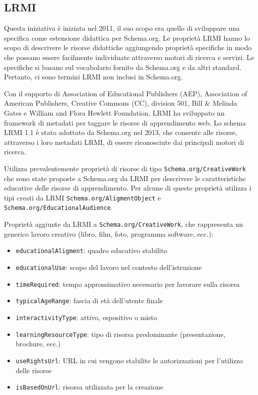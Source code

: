 \subsection{LRMI}
Questa iniziativa è iniziata nel 2011, il suo scopo era quello di sviluppare una specifica come estensione didattica per Schema.org. Le proprietà LRMI hanno lo scopo di descrivere le risorse didattiche aggiungendo proprietà specifiche in modo che possano essere facilmente individuate attraverso motori di ricerca e servizi. Le specifiche si basano sul vocabolario fornito da Schema.org e da altri standard. Pertanto, ci sono termini LRMI non inclusi in Schema.org. 

Con il supporto di Association of Educational Publishers (AEP), Association of American Publishers, Creative Commons (CC), division 501, Bill \& Melinda Gates e William and Flora Hewlett Foundation, LRMI ha sviluppato un framework di metadati per taggare le risorse di apprendimento web. Lo schema LRMI 1.1 è stato adottato da Schema.org nel 2013, che consente alle risorse, attraverso i loro metadati LRMI, di essere riconosciute dai principali motori di ricerca.

Utilizza prevalentemente proprietà di risorse di tipo \texttt{Schema.org/CreativeWork} che sono state proposte a Schema.org da LRMI per descrivere le caratteristiche educative delle risorse di apprendimento. Per alcune di queste proprietà utilizza i tipi creati da LRMI \texttt{Schema.org/AligmentObject} e \texttt{Schema.org/EducationalAudience}.

Proprietà aggiunte da LRMI a \texttt{Schema.org/CreativeWork}, che rappresenta un generico lavoro creativo (libro, film, foto, programma software, ecc.):
\begin{itemize}
\item \texttt{educationalAligment}: quadro educativo stabilito
\item \texttt{educationalUse}: scopo del lavoro nel contesto dell'istruzione
\item \texttt{timeRequired}: tempo approssimativo necessario per lavorare sulla risorsa
\item \texttt{typicalAgeRange}: fascia di età dell'utente finale
\item \texttt{interactivityType}: attivo, espositivo o misto
\item \texttt{learningResourceType}: tipo di risorsa predominante (presentazione, brochure, ecc.)
\item \texttt{useRightsUrl}: URL in cui vengono stabilite le autorizzazioni per l'utilizzo delle risorse
\item \texttt{isBasedOnUrl}: risorsa utilizzata per la creazione
\end{itemize}

